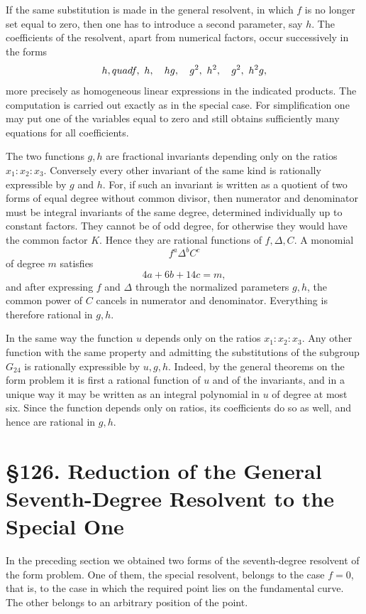 \documentclass[12pt,a4paper]{article}
\newcommand{\webersection}[2]{\clearpage\section*{\S #1. #2}}
\begin{document}
If the same substitution is made in the general resolvent, in which \(f\) is no longer set equal to zero, then one has to introduce a second parameter, say \(h\).  The coefficients of the resolvent, apart from numerical factors, occur successively in the forms
\[
 h,\\quad f,\ h,\quad hg,\quad g^2,\ h^2,\quad g^2,\ h^2g,
\]
more precisely as homogeneous linear expressions in the indicated products.  The computation is carried out exactly as in the special case.  For simplification one may put one of the variables equal to zero and still obtains sufficiently many equations for all coefficients.

The two functions \(g,h\) are fractional invariants depending only on the ratios \(x_1:x_2:x_3\).  Conversely every other invariant of the same kind is rationally expressible by \(g\) and \(h\).  For, if such an invariant is written as a quotient of two forms of equal degree without common divisor, then numerator and denominator must be integral invariants of the same degree, determined individually up to constant factors.  They cannot be of odd degree, for otherwise they would have the common factor \(K\).  Hence they are rational functions of \(f,\Delta,C\).  A monomial
\[
 f^a\Delta^bC^c
\]
of degree \(m\) satisfies
\[
 4a+6b+14c=m,
\]
and after expressing \(f\) and \(\Delta\) through the normalized parameters \(g,h\), the common power of \(C\) cancels in numerator and denominator.  Everything is therefore rational in \(g,h\).

In the same way the function \(u\) depends only on the ratios \(x_1:x_2:x_3\).  Any other function with the same property and admitting the substitutions of the subgroup \(G_{24}\) is rationally expressible by \(u,g,h\).  Indeed, by the general theorems on the form problem it is first a rational function of \(u\) and of the invariants, and in a unique way it may be written as an integral polynomial in \(u\) of degree at most six.  Since the function depends only on ratios, its coefficients do so as well, and hence are rational in \(g,h\).

\webersection{126}{Reduction of the General Seventh-Degree Resolvent to the Special One}

In the preceding section we obtained two forms of the seventh-degree resolvent of the form problem.  One of them, the special resolvent, belongs to the case \(f=0\), that is, to the case in which the required point lies on the fundamental curve.  The other belongs to an arbitrary position of the point.
\end{document}
